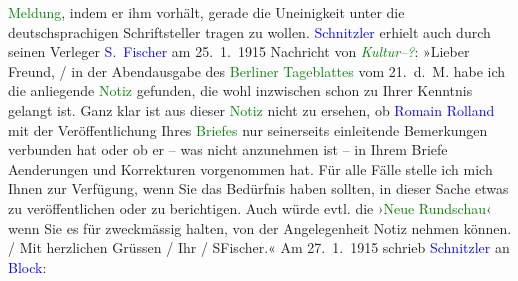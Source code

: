 {{{                     \textcolor{green}{Meldung}, indem er ihm
                  vorhält, gerade die Uneinigkeit unter die deutschsprachigen Schriftsteller tragen
                  zu wollen. \textcolor{blue}{Schnitzler} erhielt auch durch
                  seinen Verleger \textcolor{blue}{S. Fischer} am
                     25. 1. 1915 Nachricht von \emph{\textcolor{green}{Kultur–?}}: »Lieber Freund,{ / }in der Abendausgabe des \textcolor{green}{Berliner
                           Tageblattes} vom 21. d. M. habe ich die anliegende \textcolor{green}{Notiz} gefunden, die
                        wohl inzwischen schon zu Ihrer Kenntnis gelangt ist. Ganz klar ist aus
                        dieser \textcolor{green}{Notiz} nicht
                        zu ersehen, ob \textcolor{blue}{Romain Rolland} mit der
                        Veröffentlichung Ihres \textcolor{green}{Briefes} nur seinerseits einleitende Bemerkungen verbunden hat oder
                        ob er – was nicht anzunehmen ist – in Ihrem Briefe Aenderungen und
                        Korrekturen vorgenommen hat. Für alle Fälle stelle ich mich Ihnen zur
                        Verfügung, wenn Sie das Bedürfnis haben sollten, in dieser Sache etwas zu
                        veröffentlichen oder zu berichtigen. Auch würde evtl. die ›\textcolor{green}{Neue Rundschau}‹ wenn Sie es für zweckmässig halten,
                        von der Angelegenheit Notiz nehmen können.{ / }Mit herzlichen Grüssen{ / }Ihr{ / }SFischer.« Am 27. 1. 1915 schrieb \textcolor{blue}{Schnitzler} an \textcolor{blue}{Block}:
}}}
